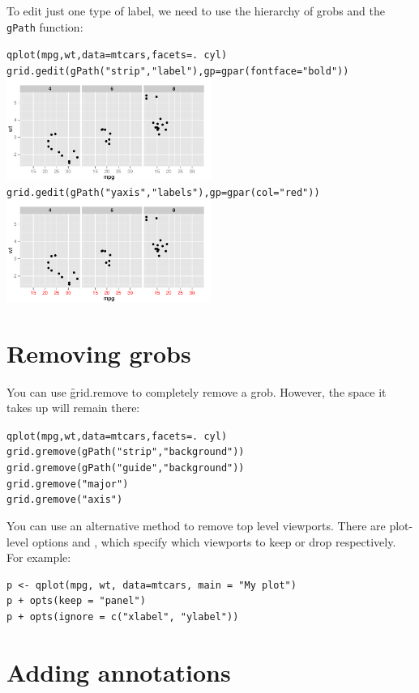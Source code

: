 To edit just one type of label, we need to use the hierarchy of grobs and the {\tt gPath} function:

\begin{alltt}
qplot(mpg, wt, data=mtcars, facets = . ~ cyl)
grid.gedit(gPath("strip","label"), gp=gpar(fontface="bold"))
\includegraphics[width=0.5\textwidth]{grid3}
grid.gedit(gPath("yaxis", "labels"), gp=gpar(col="red"))
\includegraphics[width=0.5\textwidth]{grid4}
\end{alltt}

\section{Removing grobs}
\label{sec:grid-delete}

You can use \f{grid.remove} to completely remove a grob.  However, the space it takes up will remain there:

\begin{alltt}
qplot(mpg, wt, data=mtcars, facets = . ~ cyl)
grid.gremove(gPath("strip", "background"))
grid.gremove(gPath("guide", "background"))
grid.gremove("major")
grid.gremove("axis")
\end{alltt}

You can use an alternative method to remove top level viewports.  There are plot-level options  and , which specify which viewports to keep or drop respectively.  For example:

\begin{lstlisting}
p <- qplot(mpg, wt, data=mtcars, main = "My plot")
p + opts(keep = "panel")
p + opts(ignore = c("xlabel", "ylabel"))
\end{lstlisting}

\section{Adding annotations}\label{sec:adding_annotation}
\label{sec:grid-new}

